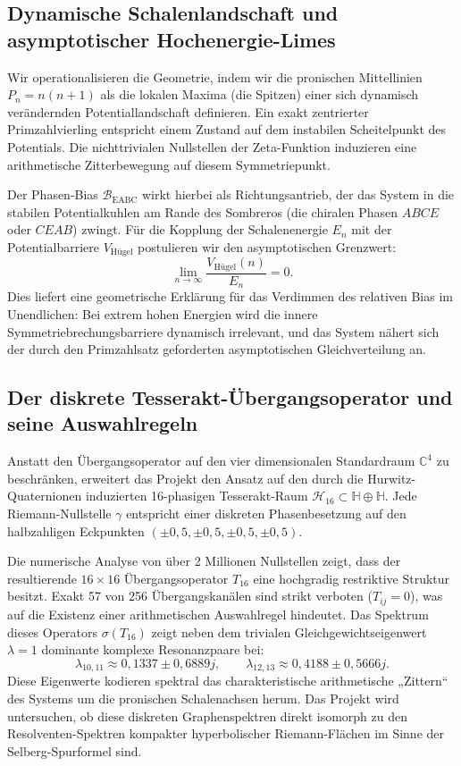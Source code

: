 \documentclass[11pt,a4paper,bibliography=totoc]{scrartcl}
\begin{document}
	\subsection{Dynamische Schalenlandschaft und asymptotischer Hochenergie-Limes}
	Wir operationalisieren die Geometrie, indem wir die pronischen Mittellinien $P_n = n(n+1)$ als die lokalen Maxima (die Spitzen) einer sich dynamisch verändernden Potentiallandschaft definieren. Ein exakt zentrierter Primzahlvierling entspricht einem Zustand auf dem instabilen Scheitelpunkt des Potentials. Die nichttrivialen Nullstellen der Zeta-Funktion induzieren eine arithmetische Zitterbewegung auf diesem Symmetriepunkt.
	
	Der Phasen-Bias $\mathcal{B}_{\mathrm{EABC}}$ wirkt hierbei als Richtungsantrieb, der das System in die stabilen Potentialkuhlen am Rande des Sombreros (die chiralen Phasen $ABCE$ oder $CEAB$) zwingt. Für die Kopplung der Schalenenergie $E_n$ mit der Potentialbarriere $V_{\mathrm{Hügel}}$ postulieren wir den asymptotischen Grenzwert:
	\[
	\lim_{n \to \infty} \frac{V_{\mathrm{Hügel}}(n)}{E_n} = 0.
	\]
	Dies liefert eine geometrische Erklärung für das Verdimmen des relativen Bias im Unendlichen: Bei extrem hohen Energien wird die innere Symmetriebrechungsbarriere dynamisch irrelevant, und das System nähert sich der durch den Primzahlsatz geforderten asymptotischen Gleichverteilung an.
	
	\subsection{Der diskrete Tesserakt-Übergangsoperator und seine Auswahlregeln}
	Anstatt den Übergangsoperator auf den vier dimensionalen Standardraum $\mathbb{C}^4$ zu beschränken, erweitert das Projekt den Ansatz auf den durch die Hurwitz-Quaternionen induzierten 16-phasigen Tesserakt-Raum $\mathcal{H}_{16} \subset \mathbb{H} \oplus \mathbb{H}$. Jede Riemann-Nullstelle $\gamma$ entspricht einer diskreten Phasenbesetzung auf den halbzahligen Eckpunkten $(\pm 0{,}5, \pm 0{,}5, \pm 0{,}5, \pm 0{,}5)$.
	
	Die numerische Analyse von über 2 Millionen Nullstellen zeigt, dass der resultierende $16 \times 16$ Übergangsoperator $T_{16}$ eine hochgradig restriktive Struktur besitzt. Exakt 57 von 256 Übergangskanälen sind strikt verboten ($T_{ij} = 0$), was auf die Existenz einer arithmetischen Auswahlregel hindeutet. Das Spektrum dieses Operators $\sigma(T_{16})$ zeigt neben dem trivialen Gleichgewichtseigenwert $\lambda = 1$ dominante komplexe Resonanzpaare bei:
	\[
	\lambda_{10,11} \approx 0{,}1337 \pm 0{,}6889j, \qquad \lambda_{12,13} \approx 0{,}4188 \pm 0{,}5666j.
	\]
	Diese Eigenwerte kodieren spektral das charakteristische arithmetische „Zittern“ des Systems um die pronischen Schalenachsen herum. Das Projekt wird untersuchen, ob diese diskreten Graphenspektren direkt isomorph zu den Resolventen-Spektren kompakter hyperbolischer Riemann-Flächen im Sinne der Selberg-Spurformel sind.
	
\end{document}
